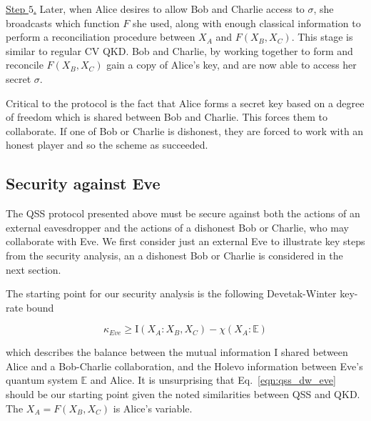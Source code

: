 \noindent \underline{Step $5$.} Later, when Alice desires to allow Bob and Charlie access to $\sigma$, she broadcasts which function $F$ she used, along with enough classical information to perform a reconciliation procedure between $X_A$ and $F\left(X_B, X_C\right)$. This stage is similar to regular CV QKD. Bob and Charlie, by working together to form and reconcile $F\left(X_B, X_C\right)$ gain a copy of Alice's key, and are now able to access her secret $\sigma$.

Critical to the protocol is the fact that Alice forms a secret key based on a degree of freedom which is shared between Bob and Charlie. This forces them to collaborate. If one of Bob or Charlie is dishonest, they are forced to work with an honest player and so the scheme as succeeded.




\subsection{Security against Eve}

The QSS protocol presented above must be secure against both the actions of an external eavesdropper and the actions of a dishonest Bob or Charlie, who may collaborate with Eve. We first consider just an external Eve to illustrate key steps from the security analysis, an a dishonest Bob or Charlie is considered in the next section.

The starting point for our security analysis is the following Devetak-Winter key-rate bound  

\begin{equation}\label{eqn:qss_dw_eve}
\kappa_{Eve} \ge \text{I}\left(X_A : X_B, X_C\right) - \chi\left(X_A : \mathbb{E}\right)
\end{equation}

\noindent which describes the balance between the mutual information $\text{I}$ shared between Alice and a Bob-Charlie collaboration, and the Holevo information between Eve's quantum system $\mathbb{E}$ and Alice. It is unsurprising that Eq.~\ref{eqn:qss_dw_eve} should be our starting point given the noted similarities between QSS and QKD. The $X_A = F\left(X_B, X_C\right)$ is Alice's variable.

